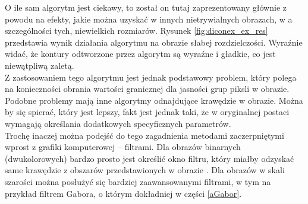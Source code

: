 O ile sam algorytm jest ciekawy, to został on tutaj zaprezentowany głównie z powodu na efekty, jakie można uzyskać w innych nietrywialnych obrazach, w a szczególności tych, niewielkich rozmiarów. Rysunek \ref{fig:diconex_ex_res} przedstawia wynik działania algorytmu na obrazie słabej rozdzielczości. Wyraźnie widać, że kontury odtworzone przez algorytm są wyraźne i gładkie, co jest niewątpliwą zaletą.\\

Z zastosowaniem tego algorytmu jest jednak podstawowy problem, który polega na konieczności obrania wartości granicznej dla jasności grup piksli w obrazie. Podobne problemy mają inne algorytmy odnajdujące krawędzie w obrazie. Można by się spierać, który jest lepszy, fakt jest jednak taki, że w oryginalnej postaci wymagają określania dodatkowych specyficznych parametrów.\\

Trochę inaczej można podejść do tego zagadnienia metodami zaczerpniętymi wprost z grafiki komputerowej -- filtrami. Dla obrazów binarnych (dwukolorowych) bardzo prosto jest określić okno filtru, który miałby odzyskać same krawędzie z obszarów przedstawionych w obrazie \cite{Tadeusiewicz}. Dla obrazów w skali szarości można posłużyć się bardziej zaawansowanymi filtrami, w tym na przykład filtrem Gabora, o którym dokładniej w części \ref{aGabor}.



